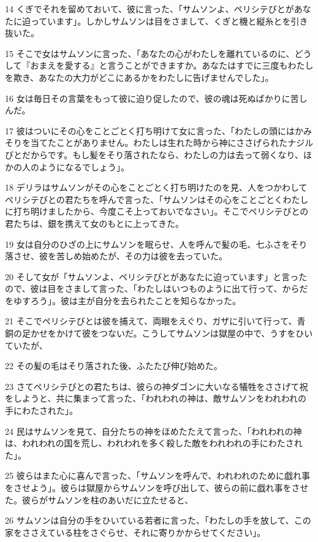 \par 14 くぎでそれを留めておいて、彼に言った、「サムソンよ、ペリシテびとがあなたに迫っています」。しかしサムソンは目をさまして、くぎと機と縦糸とを引き抜いた。
\par 15 そこで女はサムソンに言った、「あなたの心がわたしを離れているのに、どうして『おまえを愛する』と言うことができますか。あなたはすでに三度もわたしを欺き、あなたの大力がどこにあるかをわたしに告げませんでした」。
\par 16 女は毎日その言葉をもって彼に迫り促したので、彼の魂は死ぬばかりに苦しんだ。
\par 17 彼はついにその心をことごとく打ち明けて女に言った、「わたしの頭にはかみそりを当てたことがありません。わたしは生れた時から神にささげられたナジルびとだからです。もし髪をそり落されたなら、わたしの力は去って弱くなり、ほかの人のようになるでしょう」。
\par 18 デリラはサムソンがその心をことごとく打ち明けたのを見、人をつかわしてペリシテびとの君たちを呼んで言った、「サムソンはその心をことごとくわたしに打ち明けましたから、今度こそ上っておいでなさい」。そこでペリシテびとの君たちは、銀を携えて女のもとに上ってきた。
\par 19 女は自分のひざの上にサムソンを眠らせ、人を呼んで髪の毛、七ふさをそり落させ、彼を苦しめ始めたが、その力は彼を去っていた。
\par 20 そして女が「サムソンよ、ペリシテびとがあなたに迫っています」と言ったので、彼は目をさまして言った、「わたしはいつものように出て行って、からだをゆすろう」。彼は主が自分を去られたことを知らなかった。
\par 21 そこでペリシテびとは彼を捕えて、両眼をえぐり、ガザに引いて行って、青銅の足かせをかけて彼をつないだ。こうしてサムソンは獄屋の中で、うすをひいていたが、
\par 22 その髪の毛はそり落された後、ふたたび伸び始めた。
\par 23 さてペリシテびとの君たちは、彼らの神ダゴンに大いなる犠牲をささげて祝をしようと、共に集まって言った、「われわれの神は、敵サムソンをわれわれの手にわたされた」。
\par 24 民はサムソンを見て、自分たちの神をほめたたえて言った、「われわれの神は、われわれの国を荒し、われわれを多く殺した敵をわれわれの手にわたされた」。
\par 25 彼らはまた心に喜んで言った、「サムソンを呼んで、われわれのために戯れ事をさせよう」。彼らは獄屋からサムソンを呼び出して、彼らの前に戯れ事をさせた。彼らがサムソンを柱のあいだに立たせると、
\par 26 サムソンは自分の手をひいている若者に言った、「わたしの手を放して、この家をささえている柱をさぐらせ、それに寄りかからせてください」。
